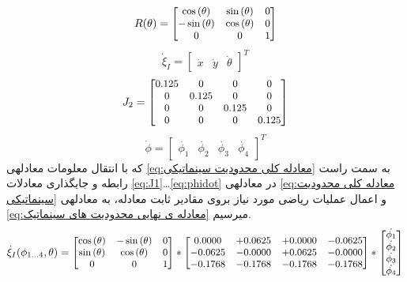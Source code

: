 \documentclass[10pt,a4paper]{article}
\newcommand{\نیمفاصله}{\halfspace}
\renewcommand{\ }{\halfspace}
\begin{document}
    \begin{equation}\small
    R(\theta) = \begin{bmatrix}
    \cos{(\theta)} & \sin{(\theta)} & 0\\
    -\sin{(\theta)} & \cos{(\theta)} & 0\\
    0 & 0 & 1
    \end{bmatrix}
    \label{eq:Rtheta}
    \end{equation}
    \begin{equation}
    \dot{\xi}_I = \begin{bmatrix}
        \dot{x} &
        \dot{y} &
        \dot{\theta}
    \end{bmatrix} ^ T
    \label{eq:xidor}    
    \end{equation}
    \begin{equation}\small
    J_2 = \begin{bmatrix}
    {\small 0.125} & 0 & 0 & 0\\
    0 & {\small 0.125} & 0 & 0\\
    0 & 0 & {\small 0.125} & 0\\
    0 & 0 & 0 & {\small 0.125}\\
    \end{bmatrix} 
    \label{eq:J2}    
    \end{equation}
    \begin{equation}
    \dot{\phi} = \begin{bmatrix}
        \dot{\phi_1} &
        \dot{\phi_2} &
        \dot{\phi_3} &
        \dot{\phi_4}
    \end{bmatrix} ^ T
    \label{eq:phidot}
    \end{equation}
که با انتقال معلومات معادله\ ی
\ref{eq:معادله کلی محدودیت سینماتیکی}
 به سمت راست رابطه و جایگذاری معادلات
\ref{eq:J1}\ldots\ref{eq:phidot}
در معادله\ ی
\ref{eq:معادله کلی محدودیت سینماتیکی}
 و اعمال عملیات ریاضی مورد نیاز بروی مقادیر ثابت معادله، به معادله\ ی
\ref{eq:معادله ی نهایی محدودیت های سینماتیک}
میرسیم.
\begin{equation}\small
\dot{\xi}_I(\phi_{1\ldots4}, \theta) = \begin{bmatrix}
    \cos{(\theta)} & -\sin{(\theta)} & 0\\
    \sin{(\theta)} & \cos{(\theta)} & 0\\
    0 & 0 & 1
\end{bmatrix} * \begin{bmatrix}
    0.0000  & +0.0625  &  +0.0000  &  -0.0625\\
   -0.0625  & -0.0000  &  +0.0625  &  -0.0000\\
   -0.1768  & -0.1768  &  -0.1768  &  -0.1768\\
\end{bmatrix} * \begin{bmatrix}
    \dot{\phi_1}\\
    \dot{\phi_2}\\
    \dot{\phi_3}\\
    \dot{\phi_4}\\
\end{bmatrix}
\label{eq:معادله ی نهایی محدودیت های سینماتیک}
\end{equation}
\end{document}
